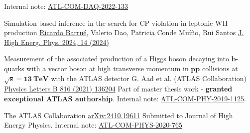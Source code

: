 


\begin{cventries}

    \begin{cventries}
        {
            Internal note: \href{https://cds.cern.ch/record/2845056}{ATL-COM-DAQ-2022-133}
        }
    \end{cventries}

    \cventry
    {Simulation-based inference in the search for CP violation in leptonic WH production}
    {\underline{Ricardo Barrué}, Valerio Dao, Patricia Conde Muíño, Rui Santos}
    {}
    {\href{https://doi.org/10.1007/JHEP04(2024)014}{J. High Energ. Phys. 2024, 14 (2024)}}
    {
    }

    \cventry
    {Measurement of the associated production of a Higgs boson decaying into $\mathbf{b}$-quarks with a vector boson at high transverse momentum in $\mathbf{pp}$ collisions at $\mathbf{\sqrt{s}= 13 \:\text{TeV}}$ with the ATLAS detector}
    {G. Aad et al. (ATLAS Collaboration)}
    {}
    {\href{https://doi.org/10.1016/j.physletb.2021.136204}{Physics Letters B 816 (2021) 136204}}
    {
        Part of master thesis work - \textbf{granted exceptional ATLAS authorship}. Internal note: \href{https://cds.cern.ch/record/2688371}{ATL-COM-PHY-2019-1125}.
    }
    
\end{cventries}


\begin{cventries}
    {The ATLAS Collaboration}{}
    {\href{https://arxiv.org/abs/2410.19611}{arXiv:2410.19611}}
    {
        Submitted to Journal of High Energy Physics. Internal note: \href{https://cds.cern.ch/record/2743096}{ATL-COM-PHYS-2020-765}
    }    
\end{cventries}


